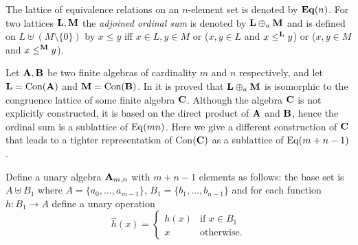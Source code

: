 The lattice of equivalence relations on an $n$-element set is denoted by
$\mathbf{Eq}(n)$. For two lattices $\mathbf L,\mathbf M$ the \emph{adjoined ordinal sum}  
is denoted by $\mathbf L\oplus_a \mathbf M$ and is defined on $L\uplus (M\setminus\{0\})$
by $x\le y$ iff $x\in L,y\in M$ or ($x,y\in L$ and $x\le^\mathbf L y$) or ($x,y\in M$
and $x\le^\mathbf M y$). 

Let $\mathbf A,\mathbf B$ be two finite algebras of cardinality $m$ and $n$ respectively,
and let $\mathbf L=\text{Con}(\mathbf A)$ and $\mathbf M=\text{Con}(\mathbf B)$. 
In \cite{Snow:2000} it is proved that $\mathbf L\oplus_a\mathbf M$ is isomorphic to the
congruence lattice of some finite algebra $\mathbf C$. Although the algebra $\mathbf C$ is
not explicitly constructed, it is based on the direct product of $\mathbf A$ and $\mathbf
B$, hence the ordinal sum is a sublattice of $\operatorname{Eq}(mn)$. Here we give a different
construction of $\mathbf C$ that leads to a tighter representation of Con$(\mathbf C)$ as
a sublattice of $\operatorname{Eq}(m+n-1)$.  

Define a unary algebra $\mathbf A_{m,n}$ with $m+n-1$ elements as follows: 
the base set is $A\uplus B_1$ where $A=\{a_0,\dots,a_{m-1}\}$,
$B_1=\{b_1,\dots,b_{n-1}\}$ and for each function $h:B_1\to A$ define a unary
operation 
$$\hat h(x)=\begin{cases}h(x)&\text{if $x\in B_1$}\\ 
x&\text{otherwise.}\end{cases}$$


